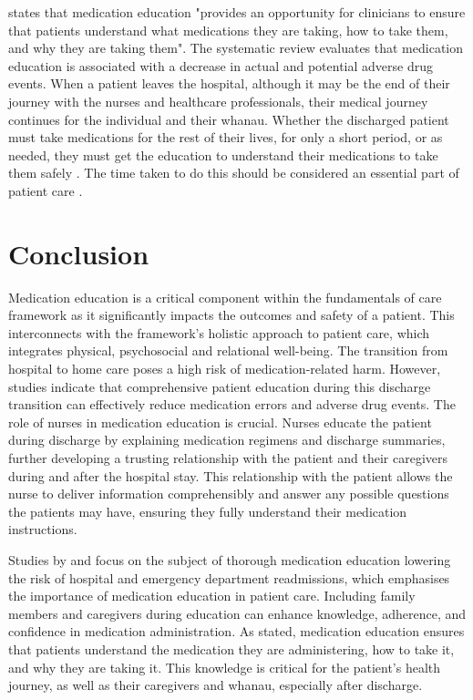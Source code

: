 \documentclass[british,12pt,a4paper]{article}
\begin{document}
\citeauthor{Alper2023} states that medication education "provides an opportunity for clinicians to ensure that patients understand what medications they are taking, how to take them, and why they are taking them". The systematic review evaluates that medication education is associated with a decrease in actual and potential adverse drug events. When a patient leaves the hospital, although it may be the end of their journey with the nurses and healthcare professionals, their medical journey continues for the individual and their whanau. Whether the discharged patient must take medications for the rest of their lives, for only a short period, or as needed, they must get the education to understand their medications to take them safely \parencite{Yap2016}. The time taken to do this should be considered an essential part of patient care \parencite{Flatman2021}.

\section{Conclusion}
Medication education is a critical component within the fundamentals of care framework as it significantly impacts the outcomes and safety of a patient. This interconnects with the framework's holistic approach to patient care, which integrates physical, psychosocial and relational well-being. The transition from hospital to home care poses a high risk of medication-related harm. However, studies indicate that comprehensive patient education during this discharge transition can effectively reduce medication errors and adverse drug events. The role of nurses in medication education is crucial. Nurses educate the patient during discharge by explaining medication regimens and discharge summaries, further developing a trusting relationship with the patient and their caregivers during and after the hospital stay. This relationship with the patient allows the nurse to deliver information comprehensibly and answer any possible questions the patients may have, ensuring they fully understand their medication instructions.

Studies by \citeauthor{Alper2023} and \citeauthor{Phatak2015} focus on the subject of thorough medication education lowering the risk of hospital and emergency department readmissions, which emphasises the importance of medication education in patient care. Including family members and caregivers during education can enhance knowledge, adherence, and confidence in medication administration. As \citeauthor{Alper2023} stated, medication education ensures that patients understand the medication they are administering, how to take it, and why they are taking it. This knowledge is critical for the patient's health journey, as well as their caregivers and whanau, especially after discharge.
\end{document}
